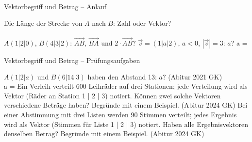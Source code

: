 \setcounter{aufgabe}{18}

\begin{aufgabe}{Vektorbegriff und Betrag – Anlauf}
\begin{teile}
\teil Die Länge der Strecke von $A$ nach $B$: Zahl oder Vektor? \\  \\ 
\teil $A(1 | 2 | 0)$, $B(4 | 3 | 2)$: $\overrightarrow{AB}$, $\overrightarrow{BA}$ und $2 \cdot \overrightarrow{AB}$?
\teil $\vec v = (1 | a | 2)$, $a < 0$, $|\vec v| = 3$: $a$? a = \leerfeld
\end{teile}
\end{aufgabe}

\begin{aufgabe}{Vektorbegriff und Betrag – Prüfungsaufgaben}
\begin{teile}
\teil $A(1 | 2 | a)$ und $B(6 | 14 | 3)$ haben den Abstand 13: $a$? \hfill (Abitur 2021 GK) \\ a = \leerfeld
\teil Ein Verleih verteilt 600 Leihräder auf drei Stationen; jede Verteilung wird als Vektor (Räder an Station 1 | 2 | 3) notiert. Können zwei solche Vektoren verschiedene Beträge haben? Begründe mit einem Beispiel. \hfill (Abitur 2024 GK)
\teil Bei einer Abstimmung mit drei Listen werden 90 Stimmen verteilt; jedes Ergebnis wird als Vektor (Stimmen für Liste 1 | 2 | 3) notiert. Haben alle Ergebnisvektoren denselben Betrag? Begründe mit einem Beispiel. \hfill (Abitur 2024 GK)
\end{teile}
\end{aufgabe}

